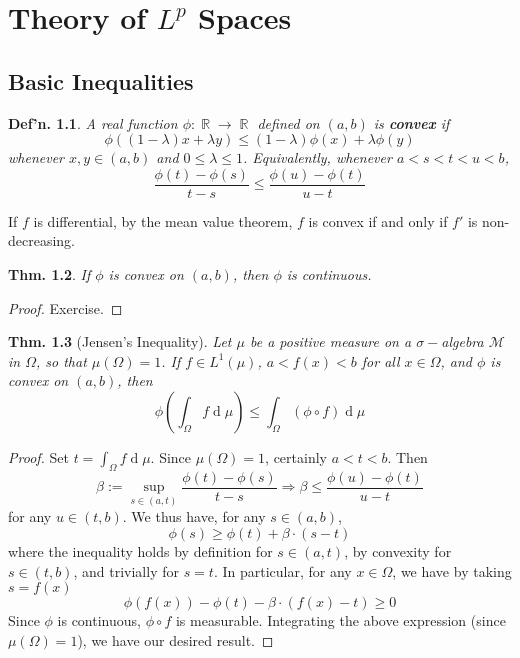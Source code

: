 \documentclass[12pt, a4paper]{book}
\DeclareMathOperator{\R}{\mathbb{R}}
\renewcommand{\d}[1]{\ensuremath{\operatorname{d}\!{#1}}} %
\newtheorem{theorem}{Thm.}[section]
\newtheorem{definition}[theorem]{Def'n.}
\theoremstyle{nonumberplain}
\newtheorem{proof}{Proof}
\begin{document}
\chapter{Theory of $L^p$ Spaces}
\section{Basic Inequalities}
\begin{definition}
    A real function $\phi:\R\to\R$ defined on $(a,b)$ is \textbf{convex} if
    \begin{equation*}
        \phi((1-\lambda)x+\lambda y)\leq(1-\lambda)\phi(x)+\lambda\phi(y)
    \end{equation*}
    whenever $x,y\in(a,b)$ and $0\leq\lambda\leq 1$.
    Equivalently, whenever $a<s<t<u<b$,
    \begin{equation*}
        \frac{\phi(t)-\phi(s)}{t-s}\leq\frac{\phi(u)-\phi(t)}{u-t}
    \end{equation*}
\end{definition}
If $f$ is differential, by the mean value theorem, $f$ is convex if and only if $f'$ is non-decreasing.
\begin{theorem}
    If $\phi$ is convex on $(a,b)$, then $\phi$ is continuous.
\end{theorem}
\begin{proof}
    Exercise.
\end{proof}
\begin{theorem}[Jensen's Inequality]
    Let $\mu$ be a positive measure on a $\sigma-$algebra $\mathcal{M}$ in $\Omega$, so that $\mu(\Omega)=1$.
    If $f\in L^1(\mu)$, $a<f(x)<b$ for all $x\in\Omega$, and $\phi$ is convex on $(a,b)$, then
    \begin{equation*}
        \phi\left(\int_\Omega f\d{\mu}\right)\leq\int_\Omega(\phi\circ f)\d{\mu}
    \end{equation*}
\end{theorem}
\begin{proof}
    Set $t=\int_\Omega f\d{\mu}$.
    Since $\mu(\Omega)=1$, certainly $a<t<b$.
    Then
    \begin{equation*}
        \beta:=\sup_{s\in(a,t)}\frac{\phi(t)-\phi(s)}{t-s}\Longrightarrow\beta\leq\frac{\phi(u)-\phi(t)}{u-t}
    \end{equation*}
    for any $u\in(t,b)$.
    We thus have, for any $s\in(a,b)$,
    \begin{equation*}
        \phi(s)\geq\phi(t)+\beta\cdot(s-t)
    \end{equation*}
    where the inequality holds by definition for $s\in(a,t)$, by convexity for $s\in(t,b)$, and trivially for $s=t$.
    In particular, for any $x\in\Omega$, we have by taking $s=f(x)$
    \begin{equation*}
        \phi(f(x))-\phi(t)-\beta\cdot(f(x)-t)\geq 0
    \end{equation*}
    Since $\phi$ is continuous, $\phi\circ f$ is measurable.
    Integrating the above expression (since $\mu(\Omega)=1$), we have our desired result.
\end{proof}
\end{document}
